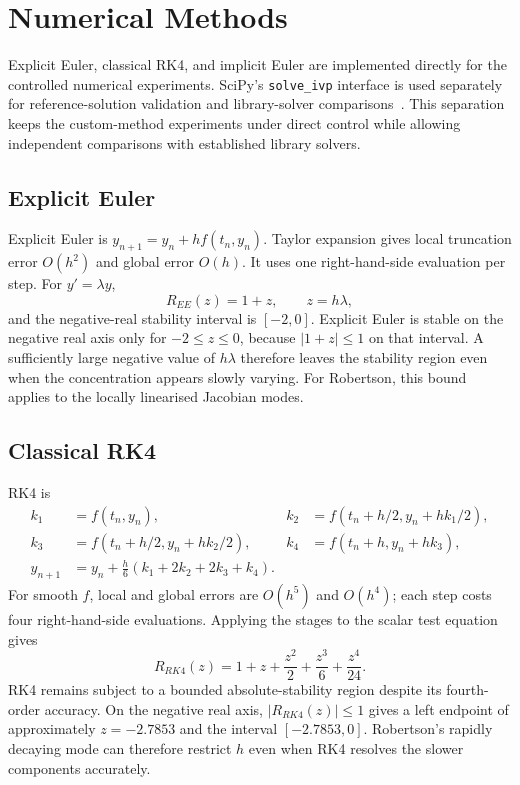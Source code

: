 \section{Numerical Methods}
Explicit Euler, classical RK4, and implicit Euler are implemented directly for the controlled numerical experiments. SciPy's \texttt{solve\_ivp} interface is used separately for reference-solution validation and library-solver comparisons~\cite{scipy}. This separation keeps the custom-method experiments under direct control while allowing independent comparisons with established library solvers.

\subsection{Explicit Euler}
Explicit Euler is $y_{n+1}=y_n+h f(t_n,y_n)$. Taylor expansion gives local truncation error $O(h^2)$ and global error $O(h)$. It uses one right-hand-side evaluation per step. For $y'=\lambda y$,
\[
R_{EE}(z)=1+z,\qquad z=h\lambda,
\]
and the negative-real stability interval is $[-2,0]$.
Explicit Euler is stable on the negative real axis only for $-2\leq z\leq0$, because $|1+z|\leq1$ on that interval. A sufficiently large negative value of $h\lambda$ therefore leaves the stability region even when the concentration appears slowly varying. For Robertson, this bound applies to the locally linearised Jacobian modes.

\subsection{Classical RK4}
RK4 is
\begin{align*}
k_1&=f(t_n,y_n),&k_2&=f(t_n+h/2,y_n+hk_1/2),\\
k_3&=f(t_n+h/2,y_n+hk_2/2),&k_4&=f(t_n+h,y_n+hk_3),\\
y_{n+1}&=y_n+\frac h6(k_1+2k_2+2k_3+k_4).
\end{align*}
For smooth $f$, local and global errors are $O(h^5)$ and $O(h^4)$; each step costs four right-hand-side evaluations. Applying the stages to the scalar test equation gives
\[
R_{RK4}(z)=1+z+\frac{z^2}{2}+\frac{z^3}{6}+\frac{z^4}{24}.
\]
RK4 remains subject to a bounded absolute-stability region despite its fourth-order accuracy. On the negative real axis, $|R_{RK4}(z)|\leq1$ gives a left endpoint of approximately $z=-2.7853$ and the interval $[-2.7853,0]$. Robertson's rapidly decaying mode can therefore restrict $h$ even when RK4 resolves the slower components accurately.

